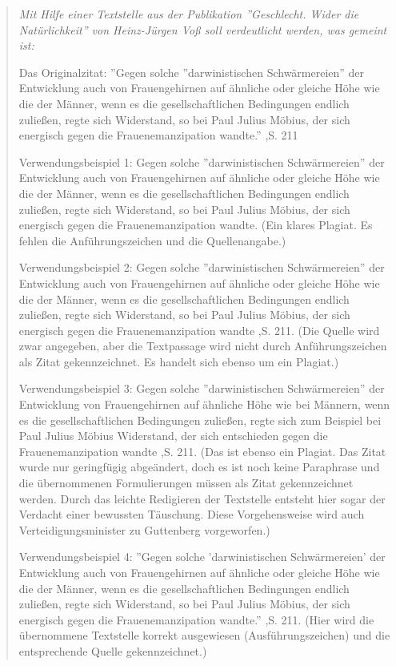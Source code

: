\begin{quote}\rmfamily\small\itshape
	Mit Hilfe einer Textstelle aus der Publikation ''Geschlecht. Wider die Natürlichkeit'' von Heinz-Jürgen Voß soll verdeutlicht werden, was gemeint ist:
	
	Das Originalzitat: ''Gegen solche ''darwinistischen Schwärmereien'' der Entwicklung auch von Frauengehirnen auf ähnliche oder gleiche Höhe wie die der Männer, wenn es die gesellschaftlichen Bedingungen endlich zuließen, regte sich Widerstand, so bei Paul Julius Möbius, der sich energisch gegen die Frauenemanzipation wandte.'' \cite{Voss2011},S. 211
	
	Verwendungsbeispiel 1: Gegen solche ''darwinistischen Schwärmereien'' der Entwicklung auch von Frauengehirnen auf ähnliche oder gleiche Höhe wie die der Männer, wenn es die gesellschaftlichen Bedingungen endlich zuließen, regte sich Widerstand, so bei Paul Julius Möbius, der sich energisch gegen die Frauenemanzipation wandte. (Ein klares Plagiat. Es fehlen die Anführungszeichen und die Quellenangabe.)
	
	
	Verwendungsbeispiel 2: Gegen solche ''darwinistischen Schwärmereien'' der Entwicklung auch von Frauengehirnen auf ähnliche oder gleiche Höhe wie die der Männer, wenn es die gesellschaftlichen Bedingungen endlich zuließen, regte sich Widerstand, so bei Paul Julius Möbius, der sich energisch gegen die Frauenemanzipation wandte \cite{Voss2011},S. 211. (Die Quelle wird zwar angegeben, aber die Textpassage wird nicht durch Anführungszeichen als Zitat gekennzeichnet. Es handelt sich ebenso um ein Plagiat.)
	
	Verwendungsbeispiel 3: Gegen solche ''darwinistischen Schwärmereien'' der Entwicklung von Frauengehirnen auf ähnliche Höhe wie bei Männern, wenn es die gesellschaftlichen Bedingungen zuließen, regte sich zum Beispiel bei Paul Julius Möbius Widerstand, der sich entschieden gegen die Frauenemanzipation wandte \cite{Voss2011},S. 211. (Das ist ebenso ein Plagiat. Das Zitat wurde nur geringfügig abgeändert, doch es ist noch keine Paraphrase und die übernommenen Formulierungen müssen als Zitat gekennzeichnet werden. Durch das leichte Redigieren der Textstelle entsteht hier sogar der Verdacht einer bewussten Täuschung. Diese Vorgehensweise wird auch Verteidigungsminister zu Guttenberg vorgeworfen.)
	
	Verwendungsbeispiel 4: ''Gegen solche 'darwinistischen Schwärmereien' der Entwicklung auch von Frauengehirnen auf ähnliche oder gleiche Höhe wie die der Männer, wenn es die gesellschaftlichen Bedingungen endlich zuließen, regte sich Widerstand, so bei Paul Julius Möbius, der sich energisch gegen die Frauenemanzipation wandte.'' \cite{Voss2011},S. 211. (Hier wird die übernommene Textstelle korrekt ausgewiesen (Ausführungszeichen) und die entsprechende Quelle gekennzeichnet.)
	

\end{quote}
